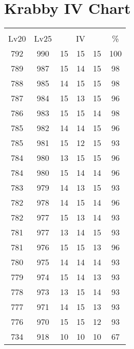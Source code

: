 \documentclass{article}%
\begin{document}
%
\normalsize%
\section{Krabby IV Chart}%
\label{sec:Krabby IV Chart}%
\renewcommand{\arraystretch}{1.5}%
\begin{tabular}{|c|c|c|c|c|c|}%
\hline%
\multicolumn{6}{|c|}{\textcolor{white}{ 
\linebreak{Krabby}
}%
\cellcolor{black}}\\%
\multicolumn{1}{|c}{Lv20}&\multicolumn{1}{c|}{Lv25}&\multicolumn{3}{c|}{IV}&\multicolumn{1}{|c|}{\%}\\%
\hline%
\rowcolor{color100}%
792&990&15&15&15&100\\%
\hline%
\rowcolor{color98}%
789&987&15&14&15&98\\%
\hline%
\rowcolor{color98}%
788&985&14&15&15&98\\%
\hline%
\rowcolor{color96}%
787&984&15&13&15&96\\%
\hline%
\rowcolor{color98}%
786&983&15&15&14&98\\%
\hline%
\rowcolor{color96}%
785&982&14&14&15&96\\%
\hline%
\rowcolor{color93}%
785&981&15&12&15&93\\%
\hline%
\rowcolor{color96}%
784&980&13&15&15&96\\%
\hline%
\rowcolor{color96}%
784&980&15&14&14&96\\%
\hline%
\rowcolor{color93}%
783&979&14&13&15&93\\%
\hline%
\rowcolor{color96}%
782&978&14&15&14&96\\%
\hline%
\rowcolor{color93}%
782&977&15&13&14&93\\%
\hline%
\rowcolor{color93}%
781&977&13&14&15&93\\%
\hline%
\rowcolor{color96}%
781&976&15&15&13&96\\%
\hline%
\rowcolor{color93}%
780&975&14&14&14&93\\%
\hline%
\rowcolor{color93}%
779&974&15&14&13&93\\%
\hline%
\rowcolor{color93}%
778&973&13&15&14&93\\%
\hline%
\rowcolor{color93}%
777&971&14&15&13&93\\%
\hline%
\rowcolor{color93}%
776&970&15&15&12&93\\%
\hline%
\rowcolor{color91}%
734&918&10&10&10&67\\%
\end{tabular}

%
\end{document}
